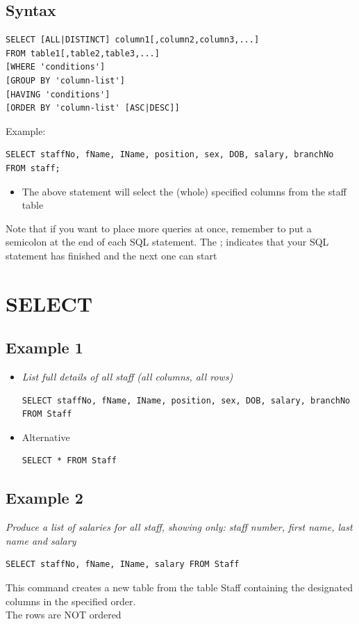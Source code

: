 \documentclass{article}[18pt]
\begin{document}
\subsection{Syntax}
\begin{verbatim}
SELECT [ALL|DISTINCT] column1[,column2,column3,...]
FROM table1[,table2,table3,...]
[WHERE 'conditions']
[GROUP BY 'column-list']
[HAVING 'conditions']
[ORDER BY 'column-list' [ASC|DESC]]
\end{verbatim}
Example:
\begin{verbatim}
SELECT staffNo, fName, IName, position, sex, DOB, salary, branchNo FROM staff;
\end{verbatim}
\begin{itemize}
	\item The above statement will select the (whole) specified columns from the staff table
\end{itemize}
Note that if you want to place more queries at once, remember to put a semicolon at the end of each SQL statement. The ; indicates that your SQL statement has finished and the next one can start
\section{SELECT}
\subsection{Example 1}
\begin{itemize}
	\item \textit{List full details of all staff (all columns, all rows)}
	\begin{verbatim}
SELECT staffNo, fName, IName, position, sex, DOB, salary, branchNo FROM Staff
	\end{verbatim}
	\item Alternative
	\begin{verbatim}
SELECT * FROM Staff
	\end{verbatim}
\end{itemize}
\subsection{Example 2}
\textit{Produce a list of salaries for all staff, showing only: staff number, first name, last name and salary}
\begin{verbatim}
SELECT staffNo, fName, IName, salary FROM Staff 
\end{verbatim}
This command creates a new table from the table Staff containing the designated columns in the specified order.\\
The rows are NOT ordered
\end{document}
